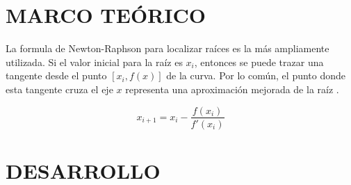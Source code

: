 \documentclass[12pt]{article}
\begin{document}
\section*{MARCO TEÓRICO}
La formula de Newton-Raphson para localizar raíces es la más ampliamente utilizada.
Si el valor inicial para la raíz es \(x_i\), entonces se puede trazar una tangente desde el punto \([x_i, f(x)]\) de la curva.
Por lo común, el punto donde esta tangente cruza el eje \(x\) representa una aproximación mejorada de la raíz \cite{chapra2011metodos}.

\[x_{i+1} = x_i - \frac{f(x_i)}{f'(x_i)} \]



\section*{DESARROLLO}
\end{document}
